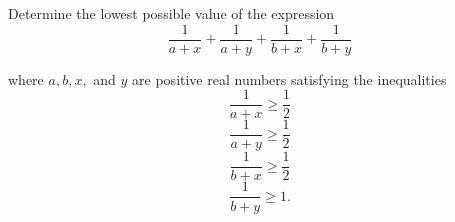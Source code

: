 Determine the lowest possible value of the expression\[ \frac{1}{a+x} + \frac{1}{a+y} + \frac{1}{b+x} + \frac{1}{b+y} \]

where $a,b,x,$ and $y$ are positive real numbers satisfying the inequalities\[ \frac{1}{a+x} \ge \frac{1}{2} \] \[\frac{1}{a+y} \ge \frac{1}{2} \] \[ \frac{1}{b+x} \ge \frac{1}{2} \] \[ \frac{1}{b+y} \ge 1. \]
